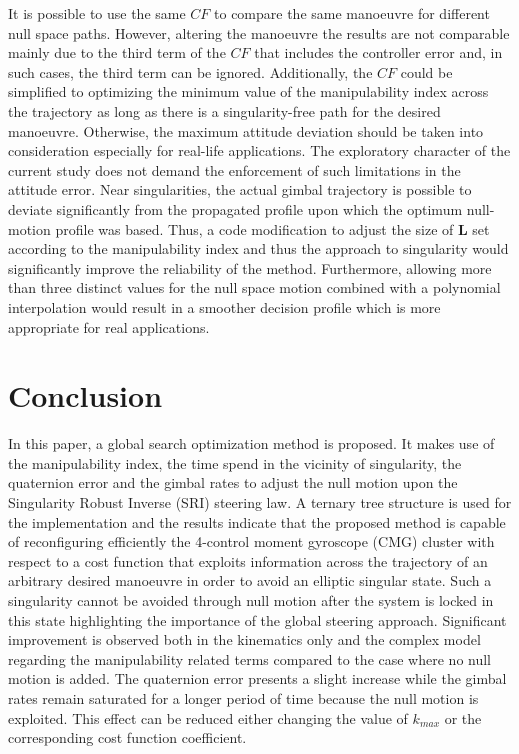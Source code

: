 \documentclass[journal]{new-aiaa}
\begin{document}
It is possible to use the same $CF$ to compare the same manoeuvre for different null space paths. However, altering the manoeuvre the results are not comparable mainly due to the third term of the $CF$ that includes the controller error and, in such cases, the third term can be ignored.
Additionally, the $CF$ could be simplified to optimizing the minimum value of the manipulability index across the trajectory as long as there is a singularity-free path for the desired manoeuvre. Otherwise, the maximum attitude deviation should be taken into consideration especially for real-life applications. The exploratory character of the current study does not demand the enforcement of such limitations in the attitude error. 
Near singularities, the actual gimbal trajectory is possible to deviate significantly from the propagated profile upon which the optimum null-motion profile was based. Thus, a code modification to adjust the size of $\textbf{L}$ set according to the manipulability index and thus the approach to singularity would significantly improve the reliability of the method. Furthermore, allowing more than three distinct values for the null space motion combined with a polynomial interpolation  would result in a smoother decision profile which is more appropriate for real applications.


\section{Conclusion}
In this paper, a global search optimization method is proposed. It makes use of the manipulability index, the time spend in the vicinity of singularity, the quaternion error and the gimbal rates to adjust the null motion upon the Singularity Robust Inverse (SRI) steering law. A ternary tree structure is used for the implementation and the results indicate that the proposed method is capable of reconfiguring efficiently the 4-control moment gyroscope (CMG) cluster with respect to a cost function that exploits information across the trajectory of an arbitrary desired manoeuvre in order to avoid an elliptic singular state. Such a singularity cannot be avoided through null motion after the system is locked in this state highlighting the importance of the global steering approach. Significant improvement is observed both in the kinematics only and the complex model regarding the manipulability related terms compared to the case where no null motion is added. The quaternion error presents a slight increase while the gimbal rates remain saturated for a longer period of time because the null motion is exploited. This effect can be reduced either changing the value of $k_{max}$ or the corresponding cost function coefficient. 
\end{document}
